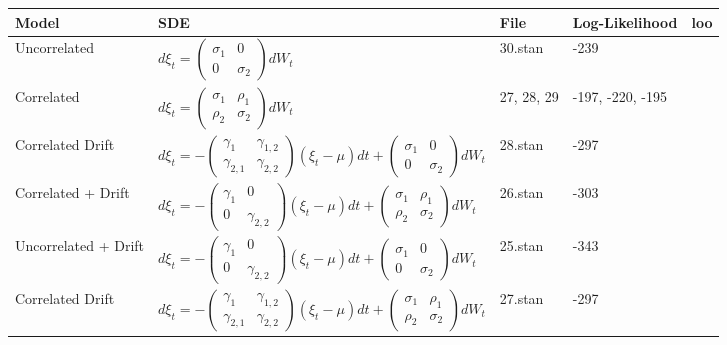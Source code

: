 \documentclass[11pt,a4paper]{article}
\begin{document}
\begin{table}
\begin{tabular}{lllll}
Model & SDE & File & Log-Likelihood & loo \\ \hline
Uncorrelated   & $d\xi_t = \left(\begin{matrix} \sigma_1 & 0 \\ 0 & \sigma_2\end{matrix}\right) dW_t$ & 30.stan & -239\\
Correlated  & $d\xi_t = \left(\begin{matrix} \sigma_1 & \rho_1 \\ \rho_2 & \sigma_2\end{matrix}\right) dW_t$ & 27, 28, 29 & -197, -220, -195 \\
\hline
Correlated Drift & $d\xi_t = - \left(\begin{matrix} \gamma_1 & \gamma_{1,2} \\ \gamma_{2,1} & \gamma_{2,2}\end{matrix}\right) \left(\xi_t-\mu\right) dt + \left(\begin{matrix} \sigma_1 & 0 \\ 0 & \sigma_2\end{matrix}\right) dW_t$ & 28.stan & -297\\
Correlated + Drift & $d\xi_t = - \left(\begin{matrix} \gamma_1 & 0 \\ 0 & \gamma_{2,2}\end{matrix}\right) \left(\xi_t-\mu\right) dt + \left(\begin{matrix} \sigma_1 & \rho_1 \\ \rho_2 & \sigma_2\end{matrix}\right) dW_t$ & 26.stan & -303 \\
Uncorrelated + Drift & $d\xi_t = - \left(\begin{matrix} \gamma_1 & 0 \\ 0 & \gamma_{2,2}\end{matrix}\right) \left(\xi_t-\mu\right) dt + \left(\begin{matrix} \sigma_1 & 0 \\ 0 & \sigma_2\end{matrix}\right) dW_t$ & 25.stan & -343 \\
Correlated Drift & $d\xi_t = - \left(\begin{matrix} \gamma_1 & \gamma_{1,2} \\ \gamma_{2,1} & \gamma_{2,2}\end{matrix}\right) \left(\xi_t-\mu\right) dt + \left(\begin{matrix} \sigma_1 & \rho_1 \\ \rho_2 & \sigma_2\end{matrix}\right) dW_t$ & 27.stan & -297\\

\end{tabular}
\end{table}
\end{document}
